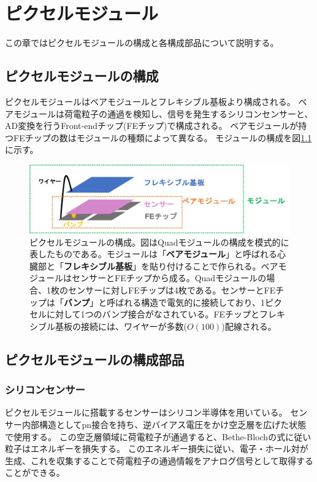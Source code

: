 \chapter{ピクセルモジュール}\label{chap:pmodule}
この章ではピクセルモジュールの構成と各構成部品について説明する。

\section{ピクセルモジュールの構成}
ピクセルモジュールはベアモジュールとフレキシブル基板より構成される。
ベアモジュールは荷電粒子の通過を検知し、信号を発生するシリコンセンサーと、AD変換を行うFront-endチップ(FEチップ)で構成される。
ベアモジュールが持つFEチップの数はモジュールの種類によって異なる。
モジュールの構成を図\ref{module_configuration}に示す。

\begin{figure}[bpt]\centering
\includegraphics[width=14cm]{./module_configuration.png}
\caption[ピクセルモジュールの構成]{ピクセルモジュールの構成。図はQuadモジュールの構成を模式的に表したものである。モジュールは「\textbf{ベアモジュール}」と呼ばれる心臓部と「\textbf{フレキシブル基板}」を貼り付けることで作られる。ベアモジュールはセンサーとFEチップから成る。Quadモジュールの場合、1枚のセンサーに対しFEチップは4枚である。センサーとFEチップは「\textbf{バンプ}」と呼ばれる構造で電気的に接続しており、1ピクセルに対して1つのバンプ接合がなされている。FEチップとフレキシブル基板の接続には、ワイヤーが多数($O(100)$)配線される。}
\label{module_configuration}
\end{figure}

\section{ピクセルモジュールの構成部品}
\subsection{シリコンセンサー}
ピクセルモジュールに搭載するセンサーはシリコン半導体を用いている。
センサー内部構造としてpn接合を持ち、逆バイアス電圧をかけ空乏層を広げた状態で使用する\cite{2-1}。
この空乏層領域に荷電粒子が通過すると、Bethe-Blochの式\cite{2-3}に従い粒子はエネルギーを損失する。
このエネルギー損失に従い、電子・ホール対が生成、これを収集することで荷電粒子の通過情報をアナログ信号として取得することができる。

